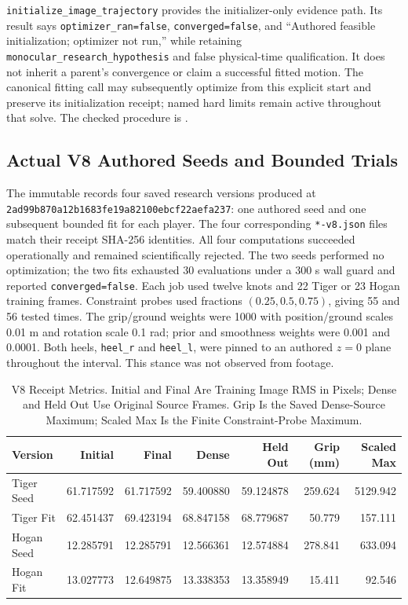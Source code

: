 \documentclass[11pt,letterpaper]{article}
\newcommand{\code}[1]{\nolinkurl{#1}}
\begin{document}
\code{initialize_image_trajectory} provides the initializer-only evidence
path. Its result says \mbox{\code{optimizer_ran=false}}, \code{converged=false}, and
``Authored feasible initialization; optimizer not run,'' while retaining
\code{monocular_research_hypothesis} and false physical-time qualification.
It does not inherit a parent's convergence or claim a successful fitted motion.
The canonical fitting call may subsequently optimize from this explicit start
and preserve its initialization receipt; named hard limits remain active
throughout that solve. The checked procedure is
.

\subsection{Actual V8 Authored Seeds and Bounded Trials}
The immutable  records four saved research
versions produced at \code{2ad99b870a12b1683fe19a82100ebcf22aefa237}:
one authored seed and one subsequent bounded fit for each player. The four
corresponding \code{*-v8.json} files match their receipt SHA-256 identities.
All four computations succeeded operationally and remained scientifically
rejected. The two seeds performed no optimization; the two fits exhausted
30 evaluations under a 300 s wall guard and reported \code{converged=false}.
Each job used twelve knots and 22 Tiger or 23 Hogan training frames. Constraint
probes used fractions $(0.25,0.5,0.75)$, giving 55 and 56 tested times.
The grip/ground weights were 1000 with position/ground scales 0.01 m and
rotation scale 0.1 rad; prior and smoothness weights were 0.001 and 0.0001.
Both heels, \code{heel_r} and \code{heel_l}, were pinned to an authored
$z=0$ plane throughout the interval. This stance was not observed from footage.

\begin{table}[ht]
\centering\small
\begin{tabular}{@{}lrrrrrr@{}}
\toprule Version & Initial & Final & Dense & Held Out & Grip (mm) & Scaled Max\\\midrule
Tiger Seed & 61.717592 & 61.717592 & 59.400880 & 59.124878 & 259.624 & 5129.942\\
Tiger Fit & 62.451437 & 69.423194 & 68.847158 & 68.779687 & 50.779 & 157.111\\
Hogan Seed & 12.285791 & 12.285791 & 12.566361 & 12.574884 & 278.841 & 633.094\\
Hogan Fit & 13.027773 & 12.649875 & 13.338353 & 13.358949 & 15.411 & 92.546\\
\bottomrule
\end{tabular}
\caption{V8 Receipt Metrics. Initial and Final Are Training Image RMS in Pixels;
Dense and Held Out Use Original Source Frames. Grip Is the Saved Dense-Source
Maximum; Scaled Max Is the Finite Constraint-Probe Maximum.}
\end{table}
\end{document}
